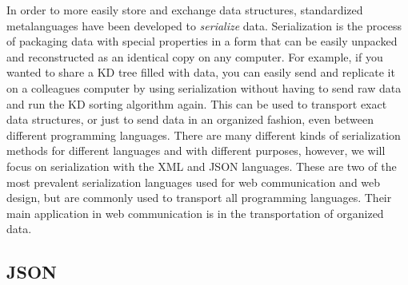 \label{lab:webtech}

In order to more easily store and exchange data structures, standardized metalanguages have been developed to \emph{serialize} data.
Serialization is the process of packaging data with special properties in a form that can be easily unpacked and reconstructed as an identical copy on any computer.
For example, if you wanted to share a KD tree filled with data, you can easily send and replicate it on a colleagues computer by using serialization without having to send raw data and run the KD sorting algorithm again.
This can be used to transport exact data structures, or just to send data in an organized fashion, even between different programming languages.
There are many different kinds of serialization methods for different languages and with different purposes, however, we will focus on serialization with the XML and JSON languages.
These are two of the most prevalent serialization languages used for web communication and web design, but are commonly used to transport all programming languages.
Their main application in web communication is in the transportation of organized data.

\begin{comment}
In order for computers to communicate one with another, they need standardized ways of storing structured data.
For example, suppose you have a python list that you want to send to somebody else. How would you store it outside of the interpreter?
However we choose to store our list, we need to be able to load it back into the Python interpreter and use it as a list.
What if we wanted to store more complex objects?
The process of serialization seeks to address this situation.
Serialization is the process of storing an object and its properties in a form that can be saved or transmitted and later reconstructed back into an identical copy of the original object.
\end{comment}

\subsection*{JSON} %

